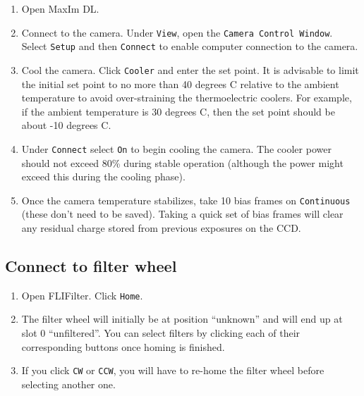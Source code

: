 \documentclass{article}
\begin{document}
	\begin{enumerate}
		
		\item Open MaxIm DL.
		
		\item Connect to the camera. Under \texttt{View}, open the \texttt{Camera Control Window}. Select \texttt{Setup} and then \texttt{Connect} to enable computer connection to the camera.
		
		\item Cool the camera. Click \texttt{Cooler} and enter the set point. It is advisable to limit the initial set point to no more than 40 degrees C relative to the ambient temperature to avoid over-straining the thermoelectric coolers. For example, if the ambient temperature is 30 degrees C, then the set point should be about -10 degrees C.
		
		\item Under \texttt{Connect} select \texttt{On} to begin cooling the camera. The cooler power should not exceed 80\% during stable operation (although the power might exceed this during the cooling phase).
		
		\item Once the camera temperature stabilizes, take 10 bias frames on \texttt{Continuous} (these don't need to be saved). Taking a quick set of bias frames will clear any residual charge stored from previous exposures on the CCD.
		
	\end{enumerate}

	\subsection{Connect to filter wheel}
	\label{sec:connect-to-filter-wheel}
	
	\begin{enumerate}
		
		\item Open FLIFilter. Click \texttt{Home}.
		
		\item The filter wheel will initially be at position ``unknown'' and will end up at slot 0 ``unfiltered''. You can select filters by clicking each of their corresponding buttons once homing is finished.
		
		\item If you click \texttt{CW} or \texttt{CCW}, you will have to re-home the filter wheel before selecting another one.
		
	\end{enumerate}
	
\end{document}
